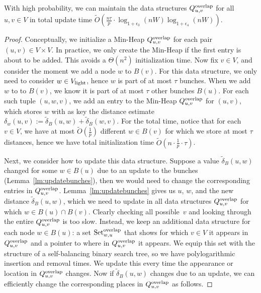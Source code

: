 \begin{lemma}\label{lm:min_heap_w}
   With high probability, we can maintain the data structures $Q^{\rm{overlap}}_{u,v}$ for all $u,v\in V$ in total update time $\tilde O (\tfrac{n\tau }{p} \cdot\log_{1+\epsilon_3}(nW)\log_{1+\epsilon_4}(nW)) $.
\end{lemma}
\begin{proof}
    Conceptually, we initialize a Min-Heap $Q^{\rm{overlap}}_{u,v}$ for each pair $(u,v)\in V\times V$. In practice, we only create the Min-Heap if the first entry is about to be added. This avoids a $\Theta(n^2)$ initialization time. Now fix $v\in V$, and consider the moment we add a node $w$ to $B(v)$. For this data structure, we only need to consider $w\in V_{\rm{light}}$, hence $w$ is part of at most $ \tau $ bunches. When we add $w$ to to $B(v)$, we know it is part of at most $\tau$ other bunches $B(u)$. For each such tuple $(u,w,v)$, we add an entry to the Min-Heap $Q^{\rm{overlap}}_{u,v}$ for $(u,v)$, which stores $w$ with as key the distance estimate $\delta_w(u,v):=\tilde\delta_B(u,w)+\tilde\delta_B(w,v)$. For the total time, notice that for each $v\in V$, we have at most $\tilde O(\tfrac{1}{p})$ different $w\in B(v)$ for which we store at most $\tau$ distances, hence we have total initialization time $ \tilde O (n \cdot \tfrac{1}{p} \cdot \tau) $.
    
    Next, we consider how to update this data structure. Suppose a value $\tilde\delta_B(u,w)$ changed for some $w\in B(u)$ due to an update to the bunches (Lemma~\ref{lm:updatebunches}), then we would need to change the corresponding entries in $Q^{\rm{overlap}}_{u,v}$. Lemma~\ref{lm:updatebunches} gives us $u$, $w$, and the new distance $\tilde \delta_B(u,w)$, which we need to update in all data structures $Q^{\rm{overlap}}_{u,v}$ for which $w\in B(u) \cap B(v)$. Clearly checking all possible~$v$ and looking through the entire $Q^{\rm{overlap}}_{u,v}$ is too slow. Instead, we keep an additional data structure for each node $w\in B(u)$: a set $\text{Set}_{w,u}^{\rm{overlap}}$ that shows for which $v\in V$ it appears in $Q^{\rm{overlap}}_{u,v}$ and a pointer to where in $Q^{\rm{overlap}}_{u,v}$ it appears. We equip this set with the structure of a self-balancing binary search tree, so we have polylogarithmic insertion and removal times. We update this every time the appearance or location in $Q^{\rm{overlap}}_{u,v}$ changes. Now if $\tilde\delta_B(u,w)$ changes due to an update, we can efficiently change the corresponding places in $Q^{\rm{overlap}}_{u,v}$ as follows. 
    

\end{proof}

